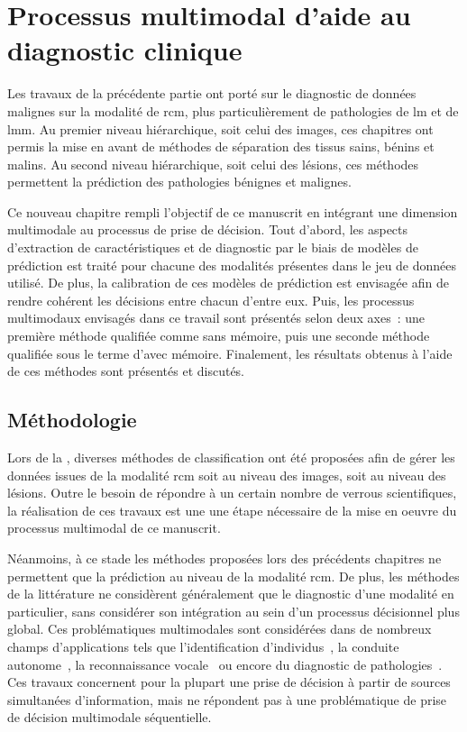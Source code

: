 \renewcommand{\thechapter}{\arabic{chapter}}
\setcounter{chapter}{7}

\chapter{Processus multimodal d'aide au diagnostic clinique}
\label{chap:chapter_8}
\chapterintro
Les travaux de la précédente partie ont porté sur le diagnostic de données malignes sur la modalité de \acrlong{rcm}, plus particulièrement de pathologies de \acrlong{lm} et de \acrlong{lmm}. Au premier niveau hiérarchique, soit celui des images, ces chapitres ont permis la mise en avant de méthodes de séparation des tissus sains, bénins et malins. Au second niveau hiérarchique, soit celui des lésions, ces méthodes permettent la prédiction des pathologies bénignes et malignes.\par

Ce nouveau chapitre rempli l'objectif de ce manuscrit en intégrant une dimension multimodale au processus de prise de décision. Tout d'abord, les aspects d'extraction de caractéristiques et de diagnostic par le biais de modèles de prédiction est traité pour chacune des modalités présentes dans le jeu de données utilisé. De plus, la calibration de ces modèles de prédiction est envisagée afin de rendre cohérent les décisions entre chacun d’entre eux. Puis, les processus multimodaux envisagés dans ce travail sont présentés selon deux axes~: une première méthode qualifiée comme sans mémoire, puis une seconde méthode qualifiée sous le terme d’avec mémoire. Finalement, les résultats obtenus à l'aide de ces méthodes sont présentés et discutés.\par
\newpage

\section{Méthodologie}
Lors de la , diverses méthodes de classification ont été proposées afin de gérer les données issues de la modalité \gls{rcm} soit au niveau des images, soit au niveau des lésions. Outre le besoin de répondre à un certain nombre de verrous scientifiques, la réalisation de ces travaux est une une étape nécessaire de la mise en oeuvre du processus multimodal de ce manuscrit.\par

Néanmoins, à ce stade les méthodes proposées lors des précédents chapitres ne permettent que la prédiction au niveau de la modalité \gls{rcm}. De plus, les méthodes de la littérature ne considèrent généralement que le diagnostic d'une modalité en particulier, sans considérer son intégration au sein d'un processus décisionnel plus global. Ces problématiques multimodales sont considérées dans de nombreux champs d'applications tels que l'identification d'individus~\cite{Lupu2008}, la conduite autonome~\cite{Xiao2019}, la reconnaissance vocale~\cite{Ngiam2011} ou encore du diagnostic de pathologies~\cite{Lim2014, Liu2015a}. Ces travaux concernent pour la plupart une prise de décision à partir de sources simultanées d'information, mais ne répondent pas à une problématique de prise de décision multimodale séquentielle.\par

